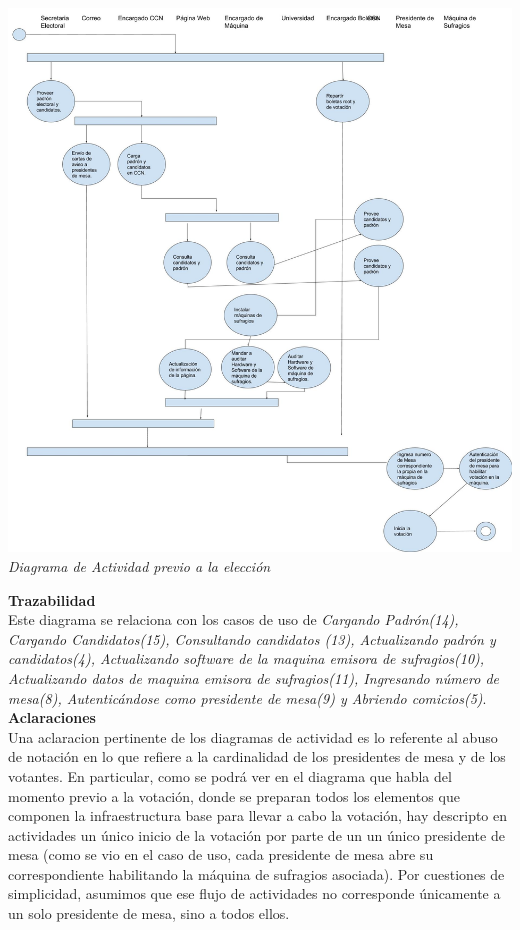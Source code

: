 \documentclass[spanish, 10pt,a4paper]{article}
\numberwithin{equation}{section} %
\begin{document}
\vspace{\baselineskip}
    \begin{center}
                \includegraphics[scale=0.25]{imagenes/actividad/PreVotacion.jpg}
                \\
                \vspace{1pt}
                \footnotesize\textit{Diagrama de Actividad previo a la elección}
        \end{center}
\vspace{\baselineskip}

\noindent\textbf{Trazabilidad}\\

Este diagrama se relaciona con los casos de uso de \textit{Cargando Padrón(14), Cargando Candidatos(15), Consultando candidatos (13), Actualizando padrón y candidatos(4), Actualizando software de la maquina emisora de sufragios(10), Actualizando datos de maquina emisora de sufragios(11), Ingresando número de mesa(8), Autenticándose como presidente de mesa(9) y Abriendo comicios(5)}.\\

\noindent\textbf{Aclaraciones}\\

Una aclaracion pertinente de los diagramas de actividad es lo referente al abuso de notación en lo que refiere a la cardinalidad de los presidentes de mesa y de los votantes. En particular, como se podrá ver en el diagrama que habla del momento previo a la votaci\'on, donde se preparan todos los elementos que componen la infraestructura base para llevar a cabo la votaci\'on, hay descripto en actividades un \'unico inicio de la votaci\'on por parte de un un único presidente de mesa (como se vio en el caso de uso, cada presidente de mesa abre su correspondiente habilitando la m\'aquina de sufragios asociada). Por cuestiones de simplicidad, asumimos que ese flujo de actividades no corresponde únicamente a un solo presidente de mesa, sino a todos ellos.
\end{document}
